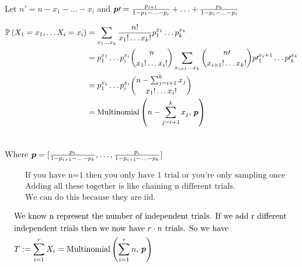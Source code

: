 \documentclass[12pt]{article}
\begin{document}
\begin{enumerate}
Let $n\prime = n-x_1-\ldots-x_i$ and $\boldsymbol{p}\prime = \frac{p_{i+1}}{1-p_1-\ldots-p_i} +\ldots+\frac{p_k}{1-p_1-\ldots-p_i}$

\begin{align*}
    \mathbb{P}\left(X_1=x_1, \ldots X_i=x_i\right) &= \sum_{x_1\ldots x_k} \frac{n!}{x_1!\ldots x_k!} p_1^{x_1} \ldots p_k^{x_k} \\
    &= p_1^{x_1} \ldots p_i^{x_i}  \binom{n}{x_1!\ldots x_i!} \sum_{x_{i+1}\ldots x_{k}} \binom{n\prime}{x_{i+1}!\ldots x_k!} p\prime_1^{x_i+1} \ldots p\prime_k^{x_k} \\ 
    &= p_1^{x_1} \ldots p_i^{x_i}  \binom{n - \sum_{j=i+1}^k x_j }{x_1!\ldots x_i!}  \\
    &= \mathrm{Multinomial}\left(n - \sum_{j=i+1}^k x_j,\,\boldsymbol{p}\right) \\ \\ 
\end{align*}

Where $\boldsymbol{p} = [\frac{p_{1}}{1-p_{i+1}-\ldots-p_k}, \ldots, \frac{p_i}{1-p_{i+1}-\ldots-p_k}]$ 


\begin{align*}
    &\text{If you have n=1 then you only have 1 trial or you're only sampling once} \\
    &\text{Adding all these together is like chaining n different trials.} \\
    &\text{We can do this because they are iid.}
\end{align*}


\begin{align*}
    &\text{We know n represent the number of independent trials. If we add r different } \\
    &\text{independent trials then we now have $r\cdot n$ trials. So we have} \\
    & T:= \sum_{i=1}^r X_i = \mathrm{Multinomial}\left(\sum_{i=1}^r n,\,\boldsymbol{p}\right)  
\end{align*}



\end{enumerate}
\end{document}
